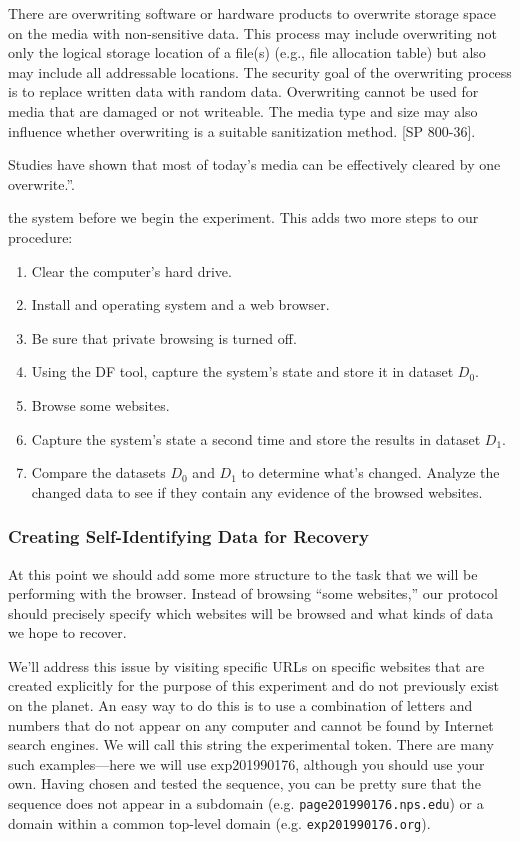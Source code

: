 There are overwriting software or hardware products to overwrite storage space on the 
media with non-sensitive data. This process may include overwriting not only the logical 
storage location of a file(s) (e.g., file allocation table) but also may include all addressable 
locations. The security goal of the overwriting process is to replace written data with 
random data. Overwriting cannot be used for media that are damaged or not writeable. 
The media type and size may also influence whether overwriting is a suitable sanitization 
method. [SP 800-36]. 

Studies have shown that most of today’s media can be effectively cleared by one overwrite.''\cite{nist-800-88}.

the system before we begin the
experiment. This adds two more steps to our procedure:

\begin{enumerate}
\item Clear the computer's hard drive.
\item Install and operating system and a web browser.
\item Be sure that private browsing is turned off.
\item Using the DF tool, capture the system's state and store it in dataset $D_0$.
\item Browse some websites.
\item Capture the system's state a second time and store the results in dataset $D_1$.
\item Compare the datasets $D_0$ and $D_1$ to determine what's
  changed. Analyze the changed data to see if they contain any
  evidence of the browsed websites. 
\end{enumerate}


\subsubsection{Creating Self-Identifying Data for Recovery}
At this point we should add some more structure to the task that we
will be performing with the browser. Instead of browsing ``some
websites,'' our protocol should precisely specify which websites will
be browsed and what kinds of data we hope to recover. 

We'll address this issue by visiting specific URLs on specific
websites that are created explicitly for the purpose of this
experiment and do not previously exist on the planet. 
An easy way to do this is to use a combination of letters and
numbers that do not appear on any computer and cannot be found by
Internet search engines. We will call this string the experimental
token. There are many such examples---here we will
use exp201990176, although you should use your own. Having chosen and
tested the sequence, you can be pretty sure that the sequence does not
appear in a subdomain (e.g. \texttt{page201990176.nps.edu}) or a domain
  within a common top-level domain (e.g. \texttt{exp201990176.org}).

